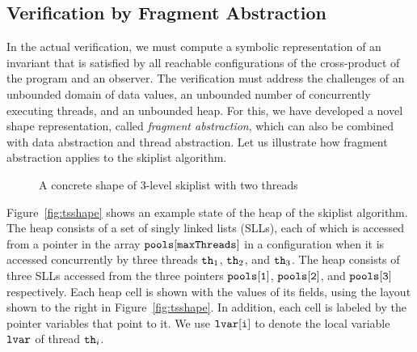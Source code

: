 \subsection{Verification by Fragment Abstraction}

In the actual verification, we must compute a symbolic representation
of an invariant that is satisfied by all reachable configurations of
the cross-product of the program  and an observer.
The verification must address the challenges of an unbounded domain of
data values, an unbounded number of concurrently executing threads, and an
unbounded heap.
For this, we have developed a novel shape representation, called
{\em fragment abstraction}, which can also be combined with
data abstraction and thread abstraction.
Let us illustrate how fragment abstraction applies to the skiplist
algorithm.
\begin{figure}
\center  
   
 \caption{A concrete shape of 3-level skiplist with two threads}
\label{sl-shape}
\end{figure}


Figure~\ref{fig:tsshape} shows an  example state of the heap of the
skiplist algorithm.
The heap consists of a set of singly linked lists (SLLs), each of which
is accessed from a pointer in the array ${\tt pools[maxThreads]}$
in a configuration when %
it is accessed concurrently by three threads ${\tt th}_1$, ${\tt th}_2$, and ${\tt th}_3$. The heap consists of three SLLs accessed from the three pointers $\tt pools[1]$, $\tt pools[2]$, and $\tt pools[3]$ respectively. Each heap cell is
shown with the values of its fields, using the layout shown to the right in
Figure~\ref{fig:tsshape}.
In addition, each cell is labeled by the
pointer variables that point to it. We use ${\tt lvar[i]}$ to denote the local
variable ${\tt lvar}$ of thread ${\tt th}_i$.

